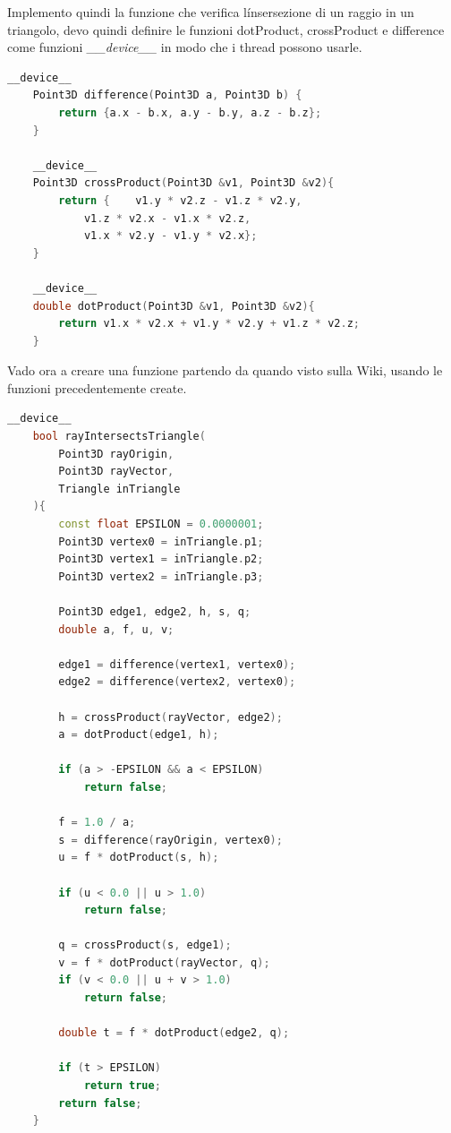 \documentclass[a4paper]{article}
\begin{document}
Implemento quindi la funzione che verifica l\'insersezione di un raggio in un triangolo, devo quindi definire le funzioni dotProduct, crossProduct e difference come funzioni \emph{\_\_device\_\_} in modo che i thread possono usarle.

\begin{lstlisting}[language=c++]
    __device__ 
    Point3D difference(Point3D a, Point3D b) {
        return {a.x - b.x, a.y - b.y, a.z - b.z};
    }

    __device__ 
    Point3D crossProduct(Point3D &v1, Point3D &v2){
        return {    v1.y * v2.z - v1.z * v2.y, 
            v1.z * v2.x - v1.x * v2.z,
            v1.x * v2.y - v1.y * v2.x};
    }

    __device__ 
    double dotProduct(Point3D &v1, Point3D &v2){
        return v1.x * v2.x + v1.y * v2.y + v1.z * v2.z;
    }
\end{lstlisting}

\newpage

Vado ora a creare una funzione partendo da quando visto sulla Wiki, usando le funzioni precedentemente create.

\begin{lstlisting}[language=c++]
    __device__ 
    bool rayIntersectsTriangle(
        Point3D rayOrigin, 
        Point3D rayVector,
        Triangle inTriangle
    ){
        const float EPSILON = 0.0000001;
        Point3D vertex0 = inTriangle.p1;
        Point3D vertex1 = inTriangle.p2;
        Point3D vertex2 = inTriangle.p3;

        Point3D edge1, edge2, h, s, q;
        double a, f, u, v;

        edge1 = difference(vertex1, vertex0);
        edge2 = difference(vertex2, vertex0);

        h = crossProduct(rayVector, edge2);
        a = dotProduct(edge1, h);

        if (a > -EPSILON && a < EPSILON)
            return false;

        f = 1.0 / a;
        s = difference(rayOrigin, vertex0);
        u = f * dotProduct(s, h);

        if (u < 0.0 || u > 1.0)
            return false;

        q = crossProduct(s, edge1);
        v = f * dotProduct(rayVector, q);
        if (v < 0.0 || u + v > 1.0)
            return false;

        double t = f * dotProduct(edge2, q);

        if (t > EPSILON)
            return true;
        return false;
    }
\end{lstlisting}
\end{document}
